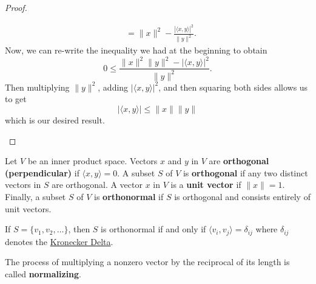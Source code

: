 \begin{proof}
\begin{enumerate}
\begin{align*}
                             &= \|x\|^{2} - \frac{ | \langle x , y \rangle |^{2} }{ \|y\|^{2} }.
        \end{align*}
        Now, we can re-write the inequality we had at the beginning to obtain
        \[  0 \leq \frac{ \|x\|^{2} \|y\|^{2} - | \langle x , y \rangle |^{2}  }{ \|y\|^{2} }.    \]
        Then multiplying \( \|y\|^{2} \), adding \( | \langle x , y \rangle |^{2} \), and then squaring both sides allows us to get
        \[  | \langle x , y \rangle | \leq \|x\| \|y\|  \]
        which is our desired result.

\end{enumerate}
\end{proof}

\begin{definition}
   Let \( V  \) be an inner product space. Vectors \( x  \) and \( y  \) in \( V  \) are \textbf{orthogonal (perpendicular)} if \( \langle x , y \rangle = 0  \). A subset \( S  \) of \( V  \) is \textbf{orthogonal} if any two distinct vectors in \( S  \) are orthogonal. A vector \( x  \) in \( V  \) is a \textbf{unit vector} if \( \| x \| = 1  \). Finally, a subset \( S  \) of \( V  \) is \textbf{orthonormal} if \( S  \) is orthogonal and consists entirely of unit vectors.  
\end{definition}

If \( S = \{ {v}_{1}, {v}_{2}, \dots  \}  \), then \( S  \) is orthonormal if and only if \( \langle {v}_{i} ,  {v}_{j} \rangle = {\delta}_{ij} \) where \( {\delta}_{ij}  \) denotes the {\hyperref[Kronecker Delta]{Kronecker Delta}}.

\begin{definition}[Normalizing]
    The process of multiplying a nonzero vector by the reciprocal of its length is called \textbf{normalizing}.
\end{definition}

